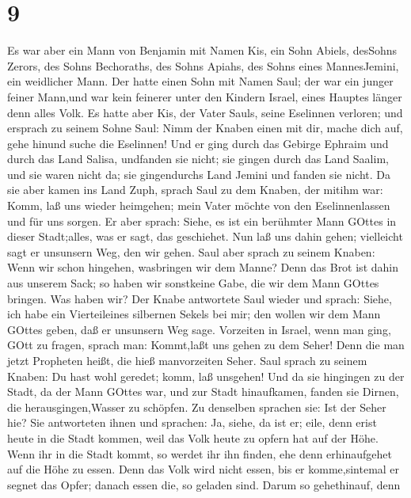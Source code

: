 \hypertarget{section-8}{%
\section{9}\label{section-8}}

 Es war aber ein Mann von Benjamin mit Namen Kis, ein Sohn
Abiels, desSohns Zerors, des Sohns Bechoraths, des Sohns Apiahs, des
Sohns eines MannesJemini, ein weidlicher Mann.  Der hatte
einen Sohn mit Namen Saul; der war ein junger feiner Mann,und war kein
feinerer unter den Kindern Israel, eines Hauptes länger denn alles Volk.
 Es hatte aber Kis, der Vater Sauls, seine Eselinnen
verloren; und ersprach zu seinem Sohne Saul: Nimm der Knaben einen mit
dir, mache dich auf, gehe hinund suche die Eselinnen!  Und
er ging durch das Gebirge Ephraim und durch das Land Salisa, undfanden
sie nicht; sie gingen durch das Land Saalim, und sie waren nicht da; sie
gingendurchs Land Jemini und fanden sie nicht.  Da sie aber
kamen ins Land Zuph, sprach Saul zu dem Knaben, der mitihm war: Komm,
laß uns wieder heimgehen; mein Vater möchte von den Eselinnenlassen und
für uns sorgen.  Er aber sprach: Siehe, es ist ein berühmter
Mann GOttes in dieser Stadt;alles, was er sagt, das geschiehet. Nun laß
uns dahin gehen; vielleicht sagt er unsunsern Weg, den wir gehen.
 Saul aber sprach zu seinem Knaben: Wenn wir schon hingehen,
wasbringen wir dem Manne? Denn das Brot ist dahin aus unserem Sack; so
haben wir sonstkeine Gabe, die wir dem Mann GOttes bringen. Was haben
wir?  Der Knabe antwortete Saul wieder und sprach: Siehe,
ich habe ein Vierteileines silbernen Sekels bei mir; den wollen wir dem
Mann GOttes geben, daß er unsunsern Weg sage.  Vorzeiten in
Israel, wenn man ging, GOtt zu fragen, sprach man: Kommt,laßt uns gehen
zu dem Seher! Denn die man jetzt Propheten heißt, die hieß manvorzeiten
Seher.  Saul sprach zu seinem Knaben: Du hast wohl geredet;
komm, laß unsgehen! Und da sie hingingen zu der Stadt, da der Mann
GOttes war,  und zur Stadt hinaufkamen, fanden sie Dirnen,
die herausgingen,Wasser zu schöpfen. Zu denselben sprachen sie: Ist der
Seher hie?  Sie antworteten ihnen und sprachen: Ja, siehe,
da ist er; eile, denn erist heute in die Stadt kommen, weil das Volk
heute zu opfern hat auf der Höhe.  Wenn ihr in die Stadt
kommt, so werdet ihr ihn finden, ehe denn erhinaufgehet auf die Höhe zu
essen. Denn das Volk wird nicht essen, bis er komme,sintemal er segnet
das Opfer; danach essen die, so geladen sind. Darum so gehethinauf, denn
